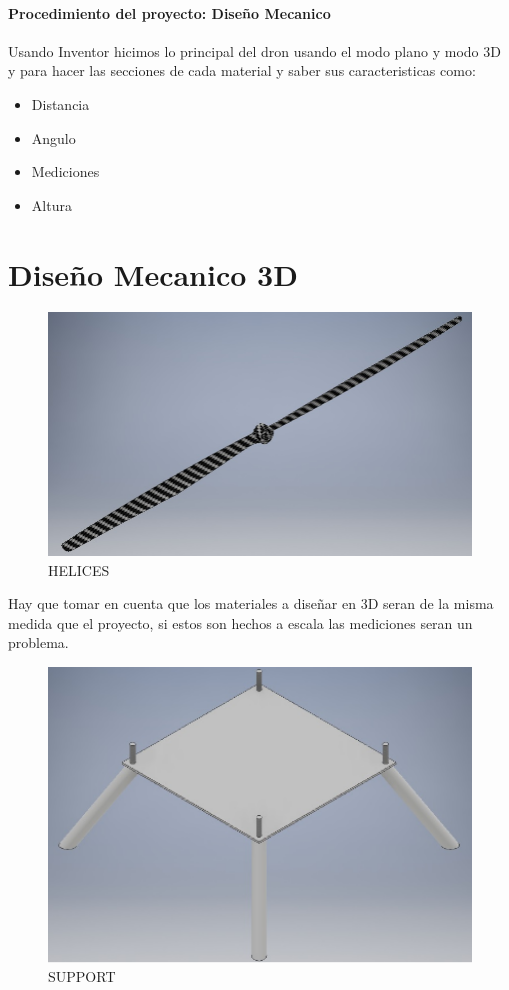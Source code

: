 \documentclass[11pt,a4paper]{article}
\begin{document}
\paragraph{Procedimiento del proyecto: Diseño Mecanico}
Usando Inventor hicimos lo principal del dron usando el modo plano y modo 3D y para hacer las secciones de cada material y saber sus caracteristicas como:\\
\begin{itemize}
\item Distancia
\item Angulo
\item Mediciones
\item Altura
\end{itemize}

\newpage 

\section{Diseño Mecanico 3D}

\begin{figure}[h]
\centering
\includegraphics[width=12cm]{Imagenes/HELICESS3.png}  
\caption{HELICES}
\end{figure}

Hay que tomar en cuenta que los materiales a diseñar en 3D seran de la misma medida que el proyecto, si estos son hechos a escala las mediciones seran un problema.

\begin{figure}[h]
\centering
\includegraphics[width=12cm]{Imagenes/SUPPORT.png} 
\caption{SUPPORT}
\end{figure}
\end{document}
